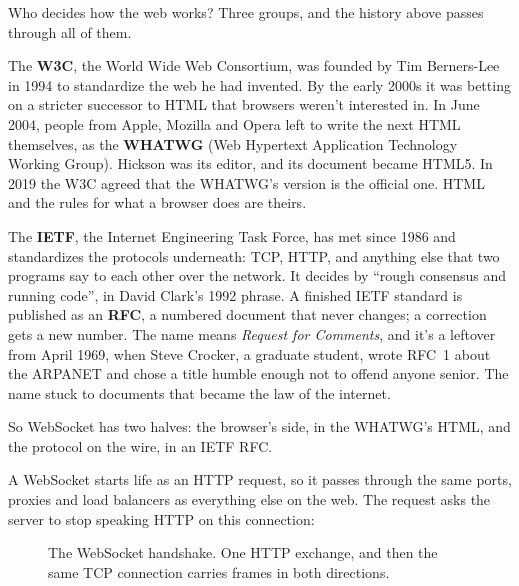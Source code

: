 \begin{question}{Who decides how the web works?}
Three groups, and the history above passes through all of them.

The \textbf{W3C}, the World Wide Web Consortium, was founded by Tim
Berners-Lee in 1994 to standardize the web he had invented. By the early 2000s
it was betting on a stricter successor to HTML that browsers weren't
interested in. In June 2004, people from Apple, Mozilla and Opera left to
write the next HTML themselves, as the \textbf{WHATWG} (Web Hypertext
Application Technology Working Group). Hickson was its editor, and its document
became HTML5. In 2019 the W3C agreed that the WHATWG's version is the official
one. HTML and the rules for what a browser does are theirs.

The \textbf{IETF}, the Internet Engineering Task Force, has met since 1986 and
standardizes the protocols underneath: TCP, HTTP, and anything else that two
programs say to each other over the network. It decides by ``rough consensus
and running code'', in David Clark's 1992 phrase. A finished IETF standard is
published as an \textbf{RFC}, a numbered document that never changes; a
correction gets a new number. The name means \emph{Request for Comments}, and
it's a leftover from April 1969, when Steve Crocker, a graduate student, wrote
RFC~1 about the ARPANET and chose a title humble enough not to offend anyone
senior. The name stuck to documents that became the law of the internet.

So WebSocket has two halves: the browser's side, in the WHATWG's HTML, and the
protocol on the wire, in an IETF RFC.
\end{question}

A WebSocket starts life as an HTTP request, so it passes through the same ports,
proxies and load balancers as everything else on the web. The request asks the
server to stop speaking HTTP on this connection:

\begin{figure}[htbp]
\centering
{}
\caption{The WebSocket handshake. One HTTP exchange, and then the same TCP
connection carries frames in both directions.}
\end{figure}

